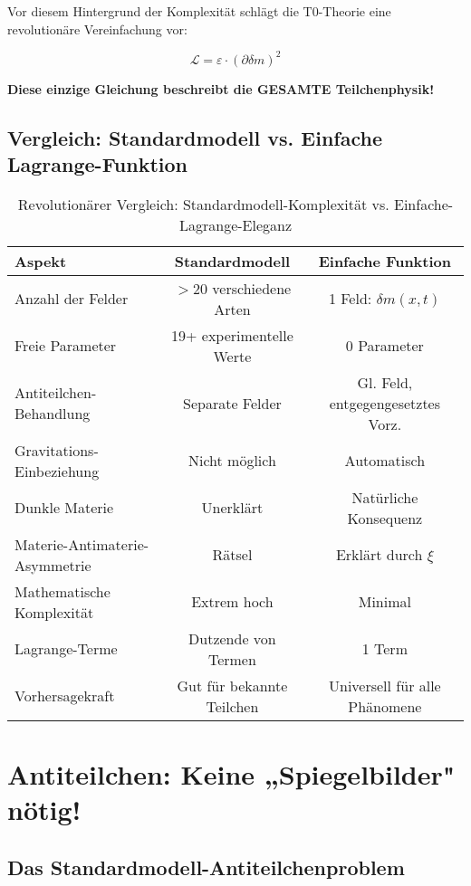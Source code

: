 \documentclass[12pt,a4paper]{article}
\newcommand{\Lag}{\mathcal{L}}
\newcommand{\deltam}{\delta m}
\newcommand{\xipar}{\xi}
\theoremstyle{definition}
\theoremstyle{remark}
\begin{document}
	Vor diesem Hintergrund der Komplexität schlägt die T0-Theorie eine revolutionäre Vereinfachung vor:
	
	\begin{equation}
		\boxed{\Lag = \varepsilon \cdot (\partial \deltam)^2}
		\label{eq:revolutionary_lagrangian}
	\end{equation}
	
	\textbf{Diese einzige Gleichung beschreibt die GESAMTE Teilchenphysik!}
	
	\subsection{Vergleich: Standardmodell vs. Einfache Lagrange-Funktion}
	
	\begin{table}[htbp]
		\centering
		\begin{tabular}{lcc}
			\toprule
			\textbf{Aspekt} & \textbf{Standardmodell} & \textbf{Einfache Funktion} \\
			\midrule
			Anzahl der Felder & $>$20 verschiedene Arten & 1 Feld: $\deltam(x,t)$ \\
			Freie Parameter & 19+ experimentelle Werte & 0 Parameter \\
			Antiteilchen-Behandlung & Separate Felder & Gl. Feld, entgegengesetztes Vorz. \\
			Gravitations-Einbeziehung & Nicht möglich & Automatisch \\
			Dunkle Materie & Unerklärt & Natürliche Konsequenz \\
			Materie-Antimaterie-Asymmetrie & Rätsel & Erklärt durch $\xipar$ \\
			Mathematische Komplexität & Extrem hoch & Minimal \\
			Lagrange-Terme & Dutzende von Termen & 1 Term \\
			Vorhersagekraft & Gut für bekannte Teilchen & Universell für alle Phänomene \\
			\bottomrule
		\end{tabular}
		\caption{Revolutionärer Vergleich: Standardmodell-Komplexität vs. Einfache-Lagrange-Eleganz}
		\label{tab:sm_simple_comparison}
	\end{table}
	
	\section{Antiteilchen: Keine „Spiegelbilder" nötig!}
	
	\subsection{Das Standardmodell-Antiteilchenproblem}
	
\end{document}
